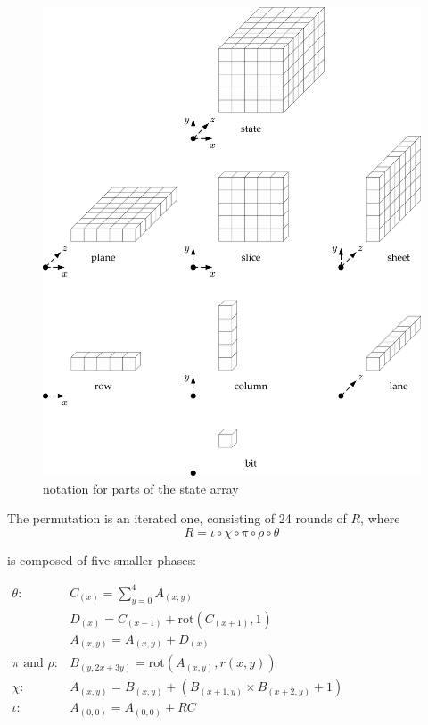\documentclass[times, utf8, diplomski]{fer}
\begin{document}
\begin{figure}[htb]
    \centering
    \includegraphics{images/keccak_state.png}
    \caption{notation for parts of the state array}
    \label{fig:keccak_state}
\end{figure}

The permutation is an iterated one, consisting of 24 rounds of $R$, where
\begin{equation*}
  R = \iota \circ \chi \circ \pi \circ \rho \circ \theta
\end{equation*}

is composed of five smaller phases:

$\begin{array}{rl}
  \theta:& C_{(x)} = \sum\limits_{y=0}^4 A_{(x,y)}\\
  &D_{(x)} = C_{(x-1)} + \text{rot}(C_{(x+1)},1)\\
  &A_{(x,y)} = A_{(x,y)} + D_{(x)}\\
  \pi \text{ and }\rho:& B_{(y,2x+3y)} = \text{rot}(A_{(x,y)}, r(x,y))\\
  \chi:& A_{(x,y)} = B_{(x,y)} + (B_{(x+1,y)} \times B_{(x+2,y)} + 1)\\
  \iota:& A_{(0,0)} = A_{(0,0)} + RC\\
\end{array}$\\
\end{document}
